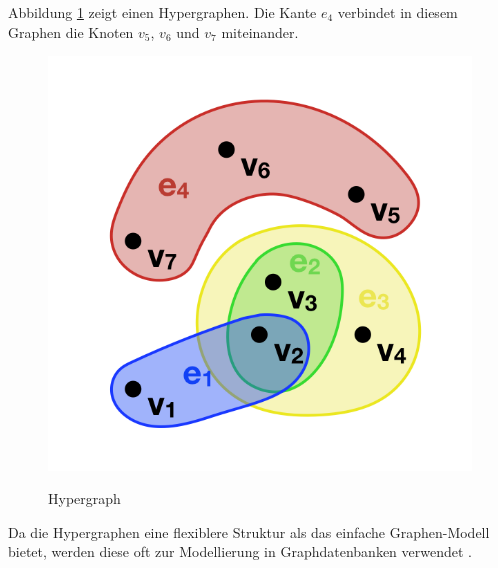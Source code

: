 Abbildung \ref{fig:hyper} zeigt einen Hypergraphen.
Die Kante $e_{4}$ verbindet in diesem Graphen die Knoten $v_{5}$, $v_{6}$ und $v_{7}$ miteinander.
\begin{figure}[H]
\begin{center}
	\includegraphics[scale = 0.5]{./images/Hypergraph2.png}
	\label{fig:hyper}
	\caption{Hypergraph}
\end{center}
\end{figure}

Da die Hypergraphen eine flexiblere Struktur als das einfache Graphen-Modell bietet, werden diese oft zur Modellierung in Graphdatenbanken verwendet \cite{flockdb}.
